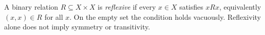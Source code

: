 
A binary relation $R\subseteq X\times X$ is \emph{reflexive} if every $x\in X$ satisfies $xRx$, equivalently $(x,x)\in R$ for all $x$. On the empty set the condition holds vacuously. Reflexivity alone does not imply symmetry or transitivity.
